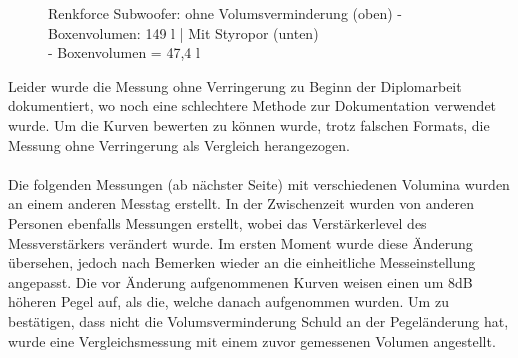 \begin{figure} [H]
	\centering
	\quad
	\caption{Renkforce Subwoofer: ohne Volumsverminderung (oben) - Boxenvolumen: 149 l | Mit Styropor (unten)\\- Boxenvolumen = 47,4 l}
	\label{fig:4.4.2.1}
\end{figure}

Leider wurde die Messung ohne Verringerung zu Beginn der Diplomarbeit dokumentiert, wo noch eine schlechtere Methode zur Dokumentation verwendet wurde.
Um die Kurven bewerten zu können wurde, trotz falschen Formats, die Messung ohne Verringerung als Vergleich herangezogen.\\ \\

Die folgenden Messungen (ab nächster Seite) mit verschiedenen Volumina wurden an einem anderen Messtag erstellt.
In der Zwischenzeit wurden von anderen Personen ebenfalls Messungen erstellt, wobei das Verstärkerlevel des Messverstärkers verändert wurde.
Im ersten Moment wurde diese Änderung übersehen, jedoch nach Bemerken wieder an die einheitliche Messeinstellung angepasst.
Die vor Änderung aufgenommenen Kurven weisen einen um 8dB höheren Pegel auf, als die, welche danach aufgenommen wurden.
Um zu bestätigen, dass nicht die Volumsverminderung Schuld an der Pegeländerung hat, wurde eine Vergleichsmessung mit einem zuvor gemessenen Volumen angestellt.\\

